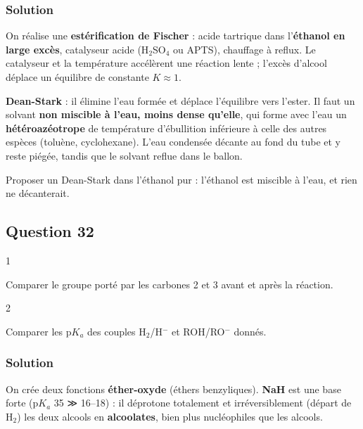 \documentclass[11pt,a4paper]{article}
\begin{document}
\hypertarget{solution-30}{%
\subsubsection{Solution}\label{solution-30}}

On réalise une \textbf{estérification de Fischer} : acide tartrique dans l'\textbf{éthanol en large excès}, catalyseur acide (H\(_2\)SO\(_4\) ou APTS), chauffage à reflux. Le catalyseur et la température accélèrent une réaction lente ; l'excès d'alcool déplace un équilibre de constante \(K\approx1\).

\textbf{Dean-Stark} : il élimine l'eau formée et déplace l'équilibre vers l'ester. Il faut un solvant \textbf{non miscible à l'eau, moins dense qu'elle}, qui forme avec l'eau un \textbf{hétéroazéotrope} de température d'ébullition inférieure à celle des autres espèces (toluène, cyclohexane). L'eau condensée décante au fond du tube et y reste piégée, tandis que le solvant reflue dans le ballon.

\begin{piege}

Proposer un Dean-Stark dans l'éthanol pur : l'éthanol est miscible à l'eau, et rien ne décanterait.

\end{piege}

\hypertarget{question-32}{%
\subsection{Question 32}\label{question-32}}

\begin{indication}{1}

Comparer le groupe porté par les carbones 2 et 3 avant et après la réaction.

\end{indication}

\begin{indication}{2}

Comparer les p\(K_a\) des couples H\(_2\)/H\(^-\) et ROH/RO\(^-\) donnés.

\end{indication}

\hypertarget{solution-31}{%
\subsubsection{Solution}\label{solution-31}}

On crée deux fonctions \textbf{éther-oxyde} (éthers benzyliques). \textbf{NaH} est une base forte (p\(K_a\) 35 ≫ 16--18) : il déprotone totalement et irréversiblement (départ de H\(_2\)) les deux alcools en \textbf{alcoolates}, bien plus nucléophiles que les alcools.
\end{document}
